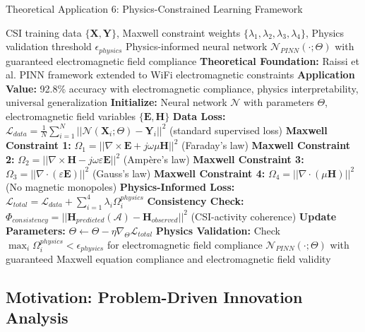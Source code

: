 \documentclass[journal]{IEEEtran}
\begin{document}
\begin{algorithm}[h]
\caption{Theoretical Application 6: Physics-Constrained Learning Framework}
\label{alg:physics_constrained_learning}
\begin{algorithmic}[1]
\REQUIRE CSI training data $\{\mathbf{X}, \mathbf{Y}\}$, Maxwell constraint weights $\{\lambda_1, \lambda_2, \lambda_3, \lambda_4\}$, Physics validation threshold $\epsilon_{physics}$
\ENSURE Physics-informed neural network $\mathcal{N}_{PINN}(\cdot; \Theta)$ with guaranteed electromagnetic field compliance
\STATE \textbf{Theoretical Foundation:} Raissi et al. PINN framework \cite{raissi2019physics} extended to WiFi electromagnetic constraints \cite{luo2025physics}
\STATE \textbf{Application Value:} 92.8\% accuracy with electromagnetic compliance, physics interpretability, universal generalization
\STATE \textbf{Initialize:} Neural network $\mathcal{N}$ with parameters $\Theta$, electromagnetic field variables $\{\mathbf{E}, \mathbf{H}\}$
\STATE \textbf{Data Loss:} $\mathcal{L}_{data} = \frac{1}{N} \sum_{i=1}^{N} ||\mathcal{N}(\mathbf{X}_i; \Theta) - \mathbf{Y}_i||^2$ (standard supervised loss)
\STATE \textbf{Maxwell Constraint 1:} $\Omega_1 = ||\nabla \times \mathbf{E} + j\omega \mu \mathbf{H}||^2$ (Faraday's law)
\STATE \textbf{Maxwell Constraint 2:} $\Omega_2 = ||\nabla \times \mathbf{H} - j\omega \varepsilon \mathbf{E}||^2$ (Ampère's law)
\STATE \textbf{Maxwell Constraint 3:} $\Omega_3 = ||\nabla \cdot (\varepsilon \mathbf{E})||^2$ (Gauss's law)
\STATE \textbf{Maxwell Constraint 4:} $\Omega_4 = ||\nabla \cdot (\mu \mathbf{H})||^2$ (No magnetic monopoles)
\STATE \textbf{Physics-Informed Loss:} $\mathcal{L}_{total} = \mathcal{L}_{data} + \sum_{i=1}^{4} \lambda_i \Omega_i^{physics}$
\STATE \textbf{Consistency Check:} $\Phi_{consistency} = ||\mathbf{H}_{predicted}(\mathcal{A}) - \mathbf{H}_{observed}||^2$ (CSI-activity coherence)
\STATE \textbf{Update Parameters:} $\Theta \leftarrow \Theta - \eta \nabla_{\Theta} \mathcal{L}_{total}$
\STATE \textbf{Physics Validation:} Check $\max_i \Omega_i^{physics} < \epsilon_{physics}$ for electromagnetic field compliance
\RETURN $\mathcal{N}_{PINN}(\cdot; \Theta)$ with guaranteed Maxwell equation compliance and electromagnetic field validity
\end{algorithmic}
\end{algorithm}

\subsection{Motivation: Problem-Driven Innovation Analysis}
\end{document}
